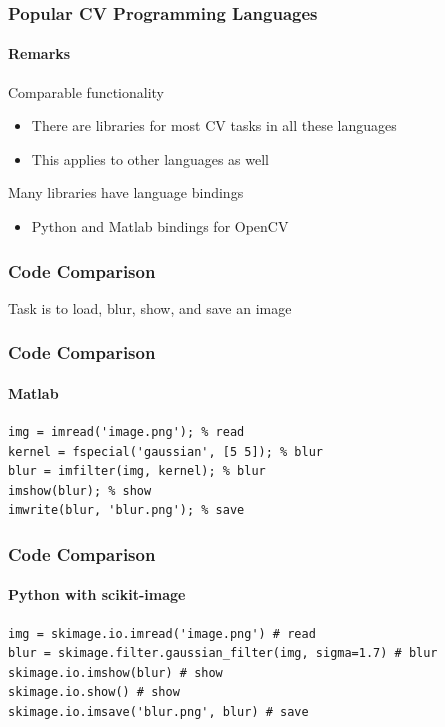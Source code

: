 \documentclass[xetex,professionalfont]{beamer}
\begin{document}

\begin{frame}
\frametitle{Popular CV Programming Languages}
\framesubtitle{Remarks}

Comparable functionality
\begin{itemize}
	\item There are libraries for most CV tasks in all these languages
	\item This applies to other languages as well
\end{itemize}

\bigskip
Many libraries have language bindings
\begin{itemize}
	\item Python and Matlab bindings for OpenCV
\end{itemize}

\end{frame}


\begin{frame}
\frametitle{Code Comparison}

Task is to load, blur, show, and save an image

\end{frame}


\begin{frame}[fragile]
\frametitle{Code Comparison}
\framesubtitle{Matlab}

\begin{verbatim}
img = imread('image.png'); % read
kernel = fspecial('gaussian', [5 5]); % blur
blur = imfilter(img, kernel); % blur
imshow(blur); % show
imwrite(blur, 'blur.png'); % save
\end{verbatim}

\end{frame}


\begin{frame}[fragile]
\frametitle{Code Comparison}
\framesubtitle{Python with scikit-image}

\begin{verbatim}
img = skimage.io.imread('image.png') # read
blur = skimage.filter.gaussian_filter(img, sigma=1.7) # blur
skimage.io.imshow(blur) # show
skimage.io.show() # show
skimage.io.imsave('blur.png', blur) # save
\end{verbatim}

\end{frame}
\end{document}
